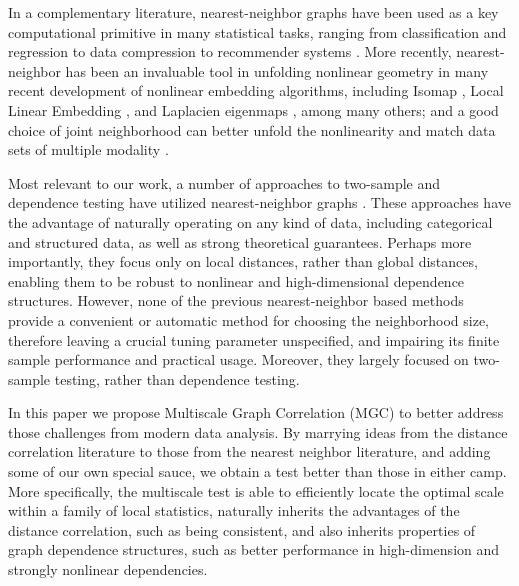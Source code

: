 \documentclass[11pt]{article}
\begin{document}
In a complementary literature, nearest-neighbor graphs have been used as a key computational primitive in many statistical tasks, ranging from classification and regression \cite{Stone1977} to data compression to recommender systems \cite{Sarwar2000}. 
More recently, nearest-neighbor has been an invaluable tool in unfolding nonlinear geometry in many recent development of nonlinear embedding algorithms, including Isomap \cite{TenenbaumSilvaLangford2000, SilvaTenenbaum2003}, Local Linear Embedding \cite{SaulRoweis2000, RoweisSaul2003}, and Laplacien eigenmaps \cite{BelkinNiyogi2003}, among many others; and a good choice of joint neighborhood can better unfold the nonlinearity and match data sets of multiple modality \cite{ShenVogelsteinPriebe2016}.

Most relevant to our work, a number of approaches to two-sample and dependence testing have utilized nearest-neighbor graphs \cite{David1966,Friedman1983,Schilling1986,Dumcke2014}.  These approaches have the advantage of naturally operating on any kind of data, including categorical and structured data, as well as strong theoretical guarantees.  Perhaps more importantly, they focus only on local distances, rather than global distances, enabling them to be robust to nonlinear and high-dimensional dependence structures.  However, none of the previous nearest-neighbor based methods provide a convenient or automatic method for choosing the neighborhood size, therefore leaving a crucial tuning parameter unspecified, and impairing its finite sample performance and practical usage. Moreover, they largely focused on two-sample testing, rather than dependence testing.  

In this paper we propose Multiscale Graph Correlation (MGC) to better address those challenges from modern data analysis. By marrying ideas from the distance correlation literature to those from the nearest neighbor literature, and adding some of our own special sauce, we obtain a test better than those in either camp.  More specifically,  the multiscale test is able to efficiently locate the optimal scale within a family of local statistics, naturally inherits the advantages of the distance correlation, such as being consistent, and also inherits properties of graph dependence structures, such as better performance in high-dimension and strongly nonlinear dependencies. %
\end{document}
